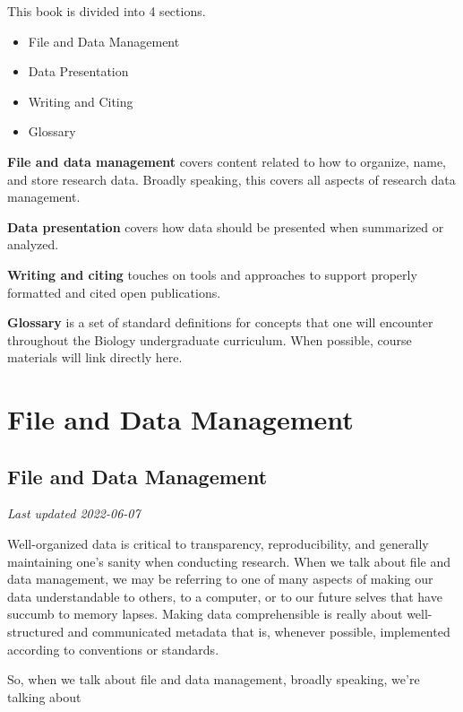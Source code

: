 \documentclass[
]{book}
\providecommand{\tightlist}{%
  \setlength{\itemsep}{0pt}\setlength{\parskip}{0pt}}
\begin{document}
This book is divided into 4 sections.

\begin{itemize}
\tightlist
\item
  File and Data Management
\item
  Data Presentation
\item
  Writing and Citing
\item
  Glossary
\end{itemize}

\textbf{File and data management} covers content related to how to organize, name, and store research data. Broadly speaking, this covers all aspects of research data management.

\textbf{Data presentation} covers how data should be presented when summarized or analyzed.

\textbf{Writing and citing} touches on tools and approaches to support properly formatted and cited open publications.

\textbf{Glossary} is a set of standard definitions for concepts that one will encounter throughout the Biology undergraduate curriculum. When possible, course materials will link directly here.

\hypertarget{part-file-and-data-management}{%
\part*{File and Data Management}\label{part-file-and-data-management}}

\hypertarget{file-and-data-management}{%
\chapter{File and Data Management}\label{file-and-data-management}}

\emph{Last updated 2022-06-07}

Well-organized data is critical to transparency, reproducibility, and generally maintaining one's sanity when conducting research. When we talk about file and data management, we may be referring to one of many aspects of making our data understandable to others, to a computer, or to our future selves that have succumb to memory lapses. Making data comprehensible is really about well-structured and communicated metadata that is, whenever possible, implemented according to conventions or standards.

So, when we talk about file and data management, broadly speaking, we're talking about
\end{document}

